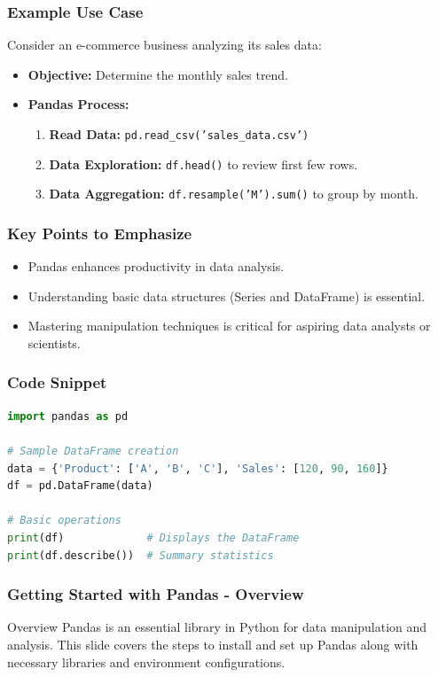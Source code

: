 \documentclass{beamer}
\begin{document}
\begin{frame}[fragile]
    \frametitle{Example Use Case}
    Consider an e-commerce business analyzing its sales data:
    \begin{itemize}
        \item \textbf{Objective:} Determine the monthly sales trend.
        \item \textbf{Pandas Process:}
        \begin{enumerate}
            \item \textbf{Read Data:} \texttt{pd.read\_csv('sales\_data.csv')}
            \item \textbf{Data Exploration:} \texttt{df.head()} to review first few rows.
            \item \textbf{Data Aggregation:} \texttt{df.resample('M').sum()} to group by month.
        \end{enumerate}
    \end{itemize}
\end{frame}

\begin{frame}[fragile]
    \frametitle{Key Points to Emphasize}
    \begin{itemize}
        \item Pandas enhances productivity in data analysis.
        \item Understanding basic data structures (Series and DataFrame) is essential.
        \item Mastering manipulation techniques is critical for aspiring data analysts or scientists.
    \end{itemize}
\end{frame}

\begin{frame}[fragile]
    \frametitle{Code Snippet}
    \begin{lstlisting}[language=Python]
import pandas as pd

# Sample DataFrame creation
data = {'Product': ['A', 'B', 'C'], 'Sales': [120, 90, 160]}
df = pd.DataFrame(data)

# Basic operations
print(df)             # Displays the DataFrame
print(df.describe())  # Summary statistics
    \end{lstlisting}
\end{frame}

\begin{frame}[fragile]
    \frametitle{Getting Started with Pandas - Overview}
    \begin{block}{Overview}
        Pandas is an essential library in Python for data manipulation and analysis. 
        This slide covers the steps to install and set up Pandas along with necessary libraries and environment configurations.
    \end{block}
\end{frame}
\end{document}
